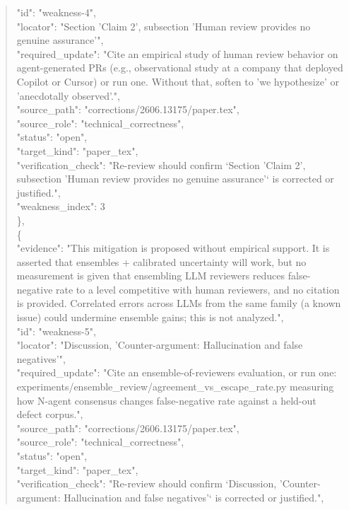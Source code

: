 \documentclass[11pt]{article}
\begin{document}
\begin{quote}
      "id": "weakness-4",\\
      "locator": "Section 'Claim 2', subsection 'Human review provides no genuine assurance'",\\
      "required\_update": "Cite an empirical study of human review behavior on agent-generated PRs (e.g., observational study at a company that deployed Copilot or Cursor) or run one. Without that, soften to 'we hypothesize' or 'anecdotally observed'.",\\
      "source\_path": "corrections/2606.13175/paper.tex",\\
      "source\_role": "technical\_correctness",\\
      "status": "open",\\
      "target\_kind": "paper\_tex",\\
      "verification\_check": "Re-review should confirm `Section 'Claim 2', subsection 'Human review provides no genuine assurance'` is corrected or justified.",\\
      "weakness\_index": 3\\
    \},\\
    \{\\
      "evidence": "This mitigation is proposed without empirical support. It is asserted that ensembles + calibrated uncertainty will work, but no measurement is given that ensembling LLM reviewers reduces false-negative rate to a level competitive with human reviewers, and no citation is provided. Correlated errors across LLMs from the same family (a known issue) could undermine ensemble gains; this is not analyzed.",\\
      "id": "weakness-5",\\
      "locator": "Discussion, 'Counter-argument: Hallucination and false negatives'",\\
      "required\_update": "Cite an ensemble-of-reviewers evaluation, or run one: experiments/ensemble\_review/agreement\_vs\_escape\_rate.py measuring how N-agent consensus changes false-negative rate against a held-out defect corpus.",\\
      "source\_path": "corrections/2606.13175/paper.tex",\\
      "source\_role": "technical\_correctness",\\
      "status": "open",\\
      "target\_kind": "paper\_tex",\\
      "verification\_check": "Re-review should confirm `Discussion, 'Counter-argument: Hallucination and false negatives'` is corrected or justified.",\\

\end{quote}
\end{document}
